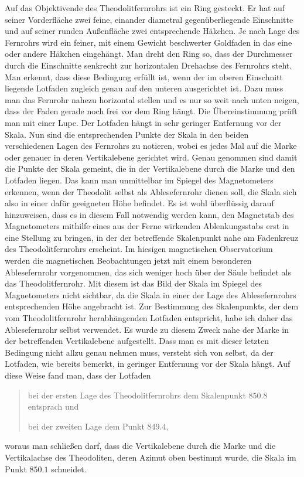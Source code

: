 Auf das Objektivende des Theodolitfernrohrs ist ein Ring gesteckt. Er hat auf seiner Vorderfläche zwei feine, einander diametral gegenüberliegende Einschnitte und auf seiner runden Außenfläche zwei entsprechende Häkchen. Je nach Lage des Fernrohrs wird ein feiner, mit einem Gewicht beschwerter Goldfaden in das eine oder andere Häkchen eingehängt. Man dreht den Ring so, dass der Durchmesser durch die Einschnitte senkrecht zur horizontalen Drehachse des Fernrohrs steht. Man erkennt, dass diese Bedingung erfüllt ist, wenn der im oberen Einschnitt liegende Lotfaden zugleich genau auf den unteren ausgerichtet ist. Dazu muss man das Fernrohr nahezu horizontal stellen und es nur so weit nach unten neigen, dass der Faden gerade noch frei vor dem Ring hängt. Die Übereinstimmung prüft man mit einer Lupe. Der Lotfaden hängt in sehr geringer Entfernung vor der Skala. Nun sind die entsprechenden Punkte der Skala in den beiden verschiedenen Lagen des Fernrohrs zu notieren, wobei es jedes Mal auf die Marke oder genauer in deren Vertikalebene gerichtet wird. Genau genommen sind damit die Punkte der Skala gemeint, die in der Vertikalebene durch die Marke und den Lotfaden liegen. Das kann man unmittelbar im Spiegel des Magnetometers erkennen, wenn der Theodolit selbst als Ablesefernrohr dienen soll, die Skala sich also in einer dafür geeigneten Höhe befindet. Es ist wohl überflüssig darauf hinzuweisen, dass es in diesem Fall notwendig werden kann, den Magnetstab
des Magnetometers mithilfe eines aus der Ferne wirkenden Ablenkungsstabs erst in eine Stellung zu bringen, in der der betreffende Skalenpunkt nahe am Fadenkreuz des Theodolitfernrohrs erscheint. Im hiesigen magnetischen Observatorium werden die magnetischen Beobachtungen jetzt mit einem besonderen Ablesefernrohr vorgenommen, das sich weniger hoch über der Säule befindet als das Theodolitfernrohr. Mit diesem ist das Bild der Skala im Spiegel des Magnetometers nicht sichtbar, da die Skala in einer der Lage des Ablesefernrohrs entsprechenden Höhe angebracht ist. Zur Bestimmung des Skalenpunkts, der dem vom Theodolitfernrohr herabhängenden Lotfaden entspricht, habe ich daher das Ablesefernrohr selbst verwendet. Es wurde zu diesem Zweck nahe der Marke in der betreffenden Vertikalebene aufgestellt. Dass man es mit dieser letzten Bedingung nicht allzu genau nehmen muss, versteht sich von selbst, da der Lotfaden, wie bereits bemerkt, in geringer Entfernung vor der Skala hängt. Auf diese Weise fand man, dass der Lotfaden
\begin{quote}
bei der ersten Lage des Theodolitfernrohrs dem Skalenpunkt $850.8$ entsprach und

 bei der zweiten Lage dem Punkt $849.4$,
\end{quote}
woraus man schließen darf, dass die Vertikalebene durch die Marke und die Vertikalachse des Theodoliten, deren Azimut oben bestimmt wurde, die Skala im Punkt $850.1$ schneidet.

